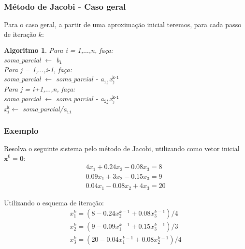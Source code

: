 \documentclass{beamer}
\theoremstyle{mystyle}
\newtheorem{algoritmo}[theorem]{Algoritmo}
\begin{document}
\begin{frame}
	\frametitle{Método de Jacobi - Caso geral}
	Para o caso geral, a partir de uma aproximação inicial teremos, \alert{para cada passo de iteração $ k $}:
	\begin{algoritmo}
		Para i = 1,$\ldots$,n, faça:\\
		\quad soma$ \_ $parcial $\leftarrow$ b$ _{\texttt{i}} $\\
		\quad Para j = 1,$\ldots$,i-1, faça:\\
		\quad\quad soma$ \_ $parcial $\leftarrow$ soma$ \_ $parcial - a$ _{\texttt{ij}} $x$ _{\texttt{j}}^{\texttt{k-1}} $\\
		\quad Para j = i+1,$\ldots$,n, faça:\\
		\quad\quad soma$ \_ $parcial $\leftarrow$ soma$ \_ $parcial - a$ _{\texttt{ij}} $x$ _{\texttt{j}}^{\texttt{k-1}} $\\
		\quad x$ _{\texttt{i}}^{\texttt{k}} \leftarrow$ soma$ \_ $parcial/a$ _{\texttt{ii}} $
	\end{algoritmo}
\end{frame}

\begin{frame}
	\frametitle{Exemplo}
	Resolva o seguinte sistema pelo método de Jacobi, utilizando como vetor inicial $ \mathbf{x}^{0} = \mathbf{0}$:
	\begin{gather*}
		4 x_1 + 0.24 x_2 - 0.08 x_3 = 8 \\
		0.09 x_1 + 3 x_2 - 0.15 x_3 = 9 \\
		0.04 x_1 - 0.08 x_2 + 4 x_3 = 20
	\end{gather*} 
	\pause 
	
	Utilizando o esquema de iteração:
	\begin{gather*}
		x_1^{k} = ( 8 - 0.24 x_2^{k-1} + 0.08 x_3^{k-1} ) / 4\\
		x_2^{k} = ( 9 - 0.09 x_1^{k-1} + 0.15 x_3^{k-1} ) / 3\\
		x_3^{k} = ( 20 - 0.04 x_1^{k-1} + 0.08 x_2^{k-1} ) / 4
	\end{gather*}
\end{frame}
\end{document}
